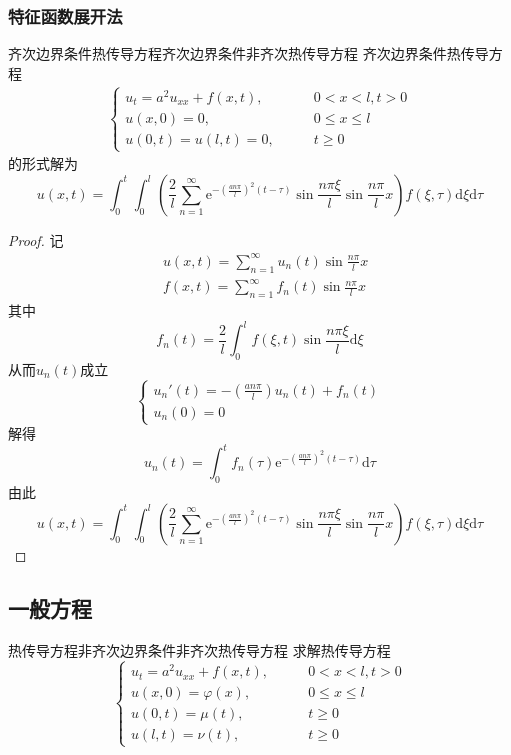 \documentclass[lang = cn, scheme = chinese, thmcnt = section]{elegantbook}
\newcommand{\dd}{\mathrm{d}}           %
\begin{document}
\subsubsection{特征函数展开法}

\begin{theorem}{齐次边界条件热传导方程}{齐次边界条件非齐次热传导方程}
	齐次边界条件热传导方程
	\begin{align*}
		\begin{cases}
			u_t=a^2u_{xx}+f(x,t),\qquad & 0<x<l,t>0\\
			u(x,0)=0,\qquad & 0\le x \le l\\
			u(0,t)=u(l,t)=0,\qquad & t\ge 0
		\end{cases}
	\end{align*}
	的形式解为
	$$
	u(x,t)
	= \int_{0}^{t}\int_{0}^{l}
	\left(\frac{2}{l}\sum_{n=1}^{\infty}\mathrm{e}^{-\left(\frac{an\pi}{l}\right)^2(t-\tau)}\sin\frac{n\pi\xi}{l}\sin\frac{n\pi}{l}x\right)
	f(\xi,\tau)\dd \xi\dd \tau
	$$
\end{theorem}

\begin{proof}
	记
	\begin{align*}
		& u(x,t)=\sum_{n=1}^{\infty}u_n(t)\sin\frac{n\pi}{l}x\\
		& f(x,t)=\sum_{n=1}^{\infty}f_n(t)\sin\frac{n\pi}{l}x
	\end{align*}
	其中%
	$$
	f_n(t)=\frac{2}{l}\int_{0}^{l}f(\xi,t)\sin\frac{n\pi\xi}{l}\dd \xi
	$$
	从而$u_n(t)$成立%
	$$
	\begin{cases}
		u_n'(t)=-\left(\frac{an\pi}{l}\right)u_n(t)+f_n(t)\\
		u_n(0)=0
	\end{cases}
	$$
	解得%
	$$
	u_n(t)=\int_{0}^{t}f_n(\tau)\mathrm{e}^{-\left(\frac{an\pi}{l}\right)^2(t-\tau)}\dd \tau
	$$
	由此%
	$$
	u(x,t)
	 = \int_{0}^{t}\int_{0}^{l}
	\left(\frac{2}{l}\sum_{n=1}^{\infty}\mathrm{e}^{-\left(\frac{an\pi}{l}\right)^2(t-\tau)}\sin\frac{n\pi\xi}{l}\sin\frac{n\pi}{l}x\right)
	f(\xi,\tau)\dd \xi\dd \tau
	$$
\end{proof}

\subsection{一般方程}

\begin{theorem}{热传导方程}{非齐次边界条件非齐次热传导方程}
	求解热传导方程
	$$
	\begin{cases}
		u_t=a^2u_{xx}+f(x,t),\qquad & 0<x<l,t>0\\
		u(x,0)=\varphi(x),\qquad & 0\le x\le l\\
		u(0,t)=\mu(t),\qquad & t\ge 0\\
		u(l,t)=\nu(t),\qquad & t\ge 0
	\end{cases}
	$$
\end{theorem}
\end{document}
